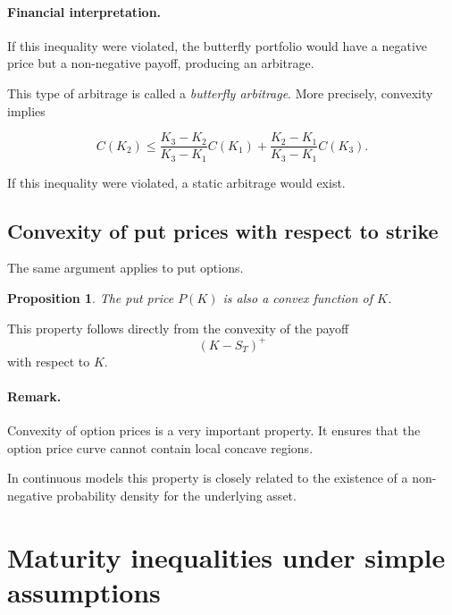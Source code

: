 \documentclass[11pt]{article}
\newcommand{\1}{\mathbf{1}}
\theoremstyle{plain}
\newtheorem{proposition}[theorem]{Proposition}
\theoremstyle{definition}
\theoremstyle{remark}
\begin{document}
\paragraph{Financial interpretation.}

If this inequality were violated, the butterfly portfolio would have
a negative price but a non-negative payoff, producing an arbitrage.

This type of arbitrage is called a \emph{butterfly arbitrage}.
More precisely, convexity implies

\[
C(K_2)
\le
\frac{K_3-K_2}{K_3-K_1}C(K_1)
+
\frac{K_2-K_1}{K_3-K_1}C(K_3).
\]

If this inequality were violated, a static arbitrage would exist.

\subsection{Convexity of put prices with respect to strike}

The same argument applies to put options.

\begin{proposition}
The put price \(P(K)\) is also a convex function of \(K\).
\end{proposition}

This property follows directly from the convexity of the payoff
\[
(K-S_T)^+
\]
with respect to \(K\).

\paragraph{Remark.}

Convexity of option prices is a very important property.
It ensures that the option price curve cannot contain local concave
regions.

In continuous models this property is closely related to the existence
of a non-negative probability density for the underlying asset.

%   

\section{Maturity inequalities under simple assumptions}
\end{document}
